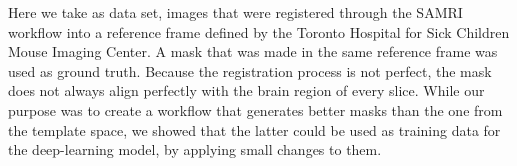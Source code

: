 Here we take as data set, images that were registered through the SAMRI workflow into a reference frame defined by the Toronto Hospital for Sick Children Mouse Imaging Center. %
A mask that was made in the same reference frame was used as ground truth.
Because the registration process is not perfect, the mask does not always align perfectly with the brain region of every slice.
While our purpose was to create a workflow that generates better masks than the one from the template space, we showed that the latter could be used as training data for the deep-learning model, by applying small changes to them.